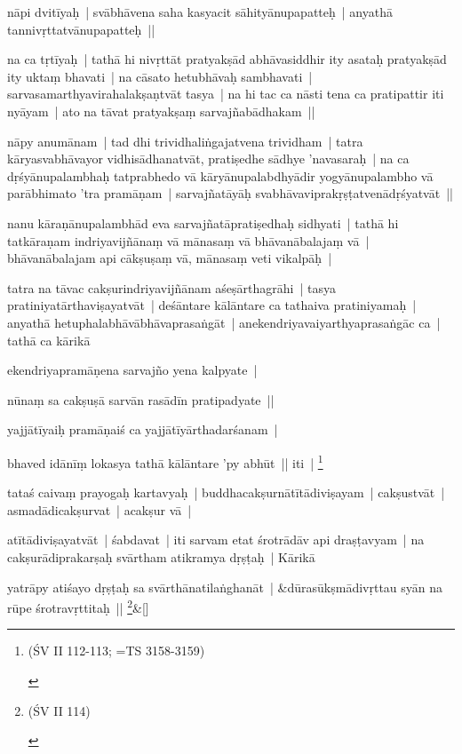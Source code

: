 \documentclass[article,12pt,a4paper]{memoir}
\newcommand{\name}[1]{#1}
\begin{document}
	  \pstart nāpi dvitīyaḥ | svābhāvena saha kasyacit sāhityānupapatteḥ | anyathā tannivṛttatvānupapatteḥ || 
	\pend
      

	  \pstart na ca tṛtīyaḥ | tathā hi nivṛttāt pratyakṣād abhāvasiddhir ity asataḥ pratyakṣād ity uktaṃ bhavati | na cāsato hetubhāvaḥ sambhavati | sarvasamarthyavirahalakṣaṇtvāt tasya | na hi tac ca nāsti tena ca pratipattir iti nyāyam | ato na tāvat pratyakṣaṃ sarvajñabādhakam || 
	\pend
      

	  \pstart nāpy anumānam | tad dhi trividhaliṅgajatvena trividham | tatra kāryasvabhāvayor vidhisādhanatvāt, pratiṣedhe sādhye 'navasaraḥ | na ca dṛśyānupalambhaḥ tatprabhedo vā kāryānupalabdhyādir yogyānupalambho vā parābhimato 'tra pramāṇam | sarvajñatāyāḥ svabhāvaviprakṛṣṭatvenādṛśyatvāt || 
	\pend
      

	  \pstart nanu kāraṇānupalambhād eva sarvajñatāpratiṣedhaḥ sidhyati | tathā hi tatkāraṇam indriyavijñānaṃ vā mānasaṃ vā bhāvanābalajaṃ vā | bhāvanābalajam api cākṣuṣaṃ vā, mānasaṃ veti vikalpāḥ | 
	\pend
      

	  \pstart tatra na tāvac cakṣurindriyavijñānam aśeṣārthagrāhi | tasya pratiniyatārthaviṣayatvāt | deśāntare kālāntare ca tathaiva pratiniyamaḥ | anyathā hetuphalabhāvābhāvaprasaṅgāt | anekendriyavaiyarthyaprasaṅgāc ca | tathā ca kārikā 
	\pend
      

	  \pstart ekendriyapramāṇena sarvajño yena kalpyate | 
	\pend
      

	  \pstart nūnaṃ sa cakṣuṣā sarvān rasādīn pratipadyate || 
	\pend
      

	  \pstart yajjātīyaiḥ pramāṇaiś ca yajjātīyārthadarśanam | 
	\pend
      

	  \pstart bhaved idānīṃ lokasya tathā kālāntare 'py abhūt || iti | \footnote{\begin{english}(ŚV II 112-113; =TS 3158-3159)\end{english}}
	\pend
      

	  \pstart tataś caivaṃ prayogaḥ kartavyaḥ | buddhacakṣurnātītādiviṣayam | cakṣustvāt | asmadādicakṣurvat | acakṣur vā | 
	\pend
      

	  \pstart atītādiviṣayatvāt | śabdavat | iti sarvam etat śrotrādāv api draṣṭavyam | na cakṣurādiprakarṣaḥ svārtham atikramya dṛṣṭaḥ | \name{Kārikā}
	\pend
      
	    
	    \stanza[\smallbreak]
	yatrāpy atiśayo dṛṣṭaḥ sa svārthānatilaṅghanāt | &dūrasūkṣmādivṛttau syān na rūpe śrotravṛttitaḥ || \footnote{\begin{english}(ŚV II 114)\end{english}}\&[\smallbreak]
\end{document}
